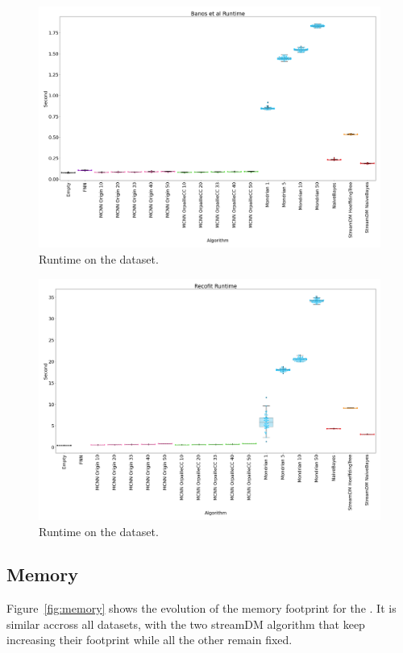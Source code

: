 \begin{figure}[H]
	\includegraphics[width=\linewidth]{figures/results/banos_runtime.png}
	\caption{Runtime on the \banosdataset dataset.}
	\label{fig:runtime-banos}
\end{figure}
\begin{figure}[H]
	\includegraphics[width=\linewidth]{figures/results/recofit_runtime.png}
	\caption{Runtime on the \recofitdataset dataset.}
	\label{fig:runtime-recofit}
\end{figure}

\subsection{Memory}
Figure~\ref{fig:memory} shows the evolution of the memory footprint for the
\banosdataset.  It is similar accross all datasets, with the two streamDM
algorithm that keep increasing their footprint while all the other remain
fixed.

